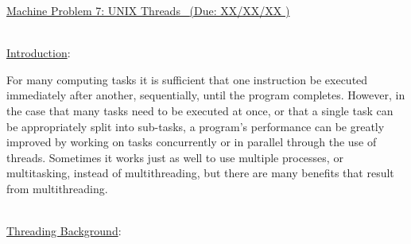 \documentclass[12pt]{extarticle}
\newenvironment{myindentpar}[1]%
 {\begin{list}{}%
         {\setlength{\leftmargin}{#1}}%
         \item[]%
 }
 {\end{list}}
\newcommand{\duedate}{XX/XX/XX }
\begin{document}
\begin{center}
    \underline{{\large Machine Problem 7: UNIX Threads \  }(Due: \duedate)}  \\
\end{center}

\ \\
{\large \underline{Introduction}:}

\begin{myindentpar}{5mm}

    \noindent
    For many computing tasks it is sufficient that one instruction be executed immediately after another, sequentially, until the program completes. However, in the case that many tasks need to be executed at once, or that a single task can be appropriately split into sub-tasks, a program’s performance can be greatly improved by working on tasks concurrently or in parallel through the use of threads. Sometimes it works just as well to use multiple processes, or multitasking, instead of multithreading, but there are many benefits that result from multithreading.  

\end{myindentpar}

\ \\
{\large \underline{Threading Background}:}
\end{document}
